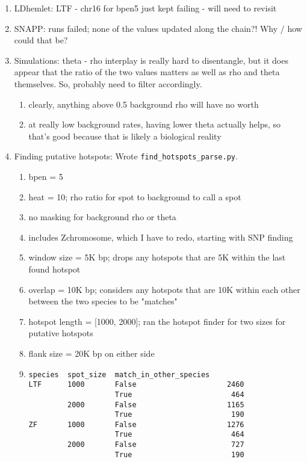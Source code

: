 \documentclass[idxtotoc,hyperref,openany,oneside]{labbook} %
\begin{document}
\begin{enumerate}
\item LDhemlet: LTF - chr16 for bpen5 just kept failing - will need to revisit
\item SNAPP: runs failed; none of the values updated along the chain?! Why / how could that be?
\item Simulations: theta - rho interplay is really hard to disentangle, but it does appear that the ratio of the two values matters as well as rho and theta themselves. So, probably need to filter accordingly.
\begin{enumerate}
	\item clearly, anything above 0.5 background rho will have no worth
	\item at really low background rates, having lower theta actually helps, so that's good because that is likely a biological reality
\end{enumerate}
\item Finding putative hotspots: Wrote \verb+find_hotspots_parse.py+.
\begin{enumerate}
\item bpen = 5
\item heat = 10; rho ratio for spot to background to call a spot
\item no masking for background rho or theta
\item includes Zchromosome, which I have to redo, starting with SNP finding
\item window size = 5K bp; drops any hotspots that are 5K within the last found hotspot
\item overlap = 10K bp; considers any hotspots that are 10K within each other between the two species to be "matches"
\item hotspot length = [1000, 2000]; ran the hotspot finder for two sizes for putative hotspots
\item flank size = 20K bp on either side
\item
\begin{verbatim}
species  spot_size  match_in_other_species
LTF      1000       False                     2460
                    True                       464
         2000       False                     1165
                    True                       190
ZF       1000       False                     1276
                    True                       464
         2000       False                      727
                    True                       190
\end{verbatim}

\end{enumerate}
\end{enumerate}
\end{document}
